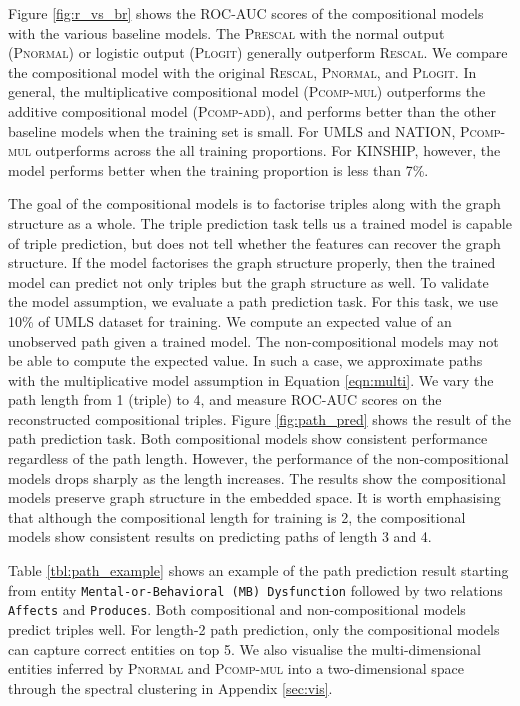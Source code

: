 Figure \ref{fig:r_vs_br} shows the ROC-AUC scores of the compositional models
with the various baseline models. The \textsc{Prescal} with
the normal output (\textsc{Pnormal}) or logistic output (\textsc{Plogit}) generally outperform \textsc{Rescal}.
We compare the compositional model with the original \textsc{Rescal}, \textsc{Pnormal}, and \textsc{Plogit}.
In general, the multiplicative compositional model (\textsc{Pcomp-mul}) outperforms
the additive compositional model (\textsc{Pcomp-add}), and performs better than the other baseline models
when the training set is small. For UMLS and NATION, \textsc{Pcomp-mul} outperforms
across the all training proportions.
For KINSHIP, however, the model performs better when the training proportion is less than 7\%.

The goal of the compositional models is to factorise triples along with the graph structure as a whole.
The triple prediction task tells us a trained model is capable of triple prediction,
but does not tell whether the features can recover the graph structure.
If the model factorises the graph structure properly,
then the trained model can predict not only triples but the graph structure as well.
To validate the model assumption, we evaluate a path prediction task.
For this task, we use 10\% of UMLS dataset for training.
We compute an expected value of an unobserved path given a trained model.
The non-compositional models may not be able to compute the expected value.
In such a case, we approximate paths with the multiplicative model assumption in Equation \ref{eqn:multi}.
We vary the path length from 1 (triple) to 4, and measure ROC-AUC scores on the reconstructed compositional triples.
Figure \ref{fig:path_pred} shows the result of the path prediction task.
Both compositional models show consistent performance regardless of the path length.
However, the performance of the non-compositional models drops sharply as the length increases.
The results show the compositional models preserve graph structure in the embedded space.
It is worth emphasising that although the compositional length for training is 2,
the compositional models show consistent results on predicting paths of length 3 and 4.

Table \ref{tbl:path_example} shows an example of the path prediction result
starting from entity \texttt{Mental-or-Behavioral (MB) Dysfunction} followed by two relations \texttt{Affects} and \texttt{Produces}.
Both compositional and non-compositional models predict triples well.
For length-2 path prediction, only the compositional models can capture correct entities on top 5.
We also visualise the multi-dimensional entities inferred by \textsc{Pnormal} and \textsc{Pcomp-mul}
into a two-dimensional space through the spectral clustering \cite{von2007tutorial}
in Appendix \ref{sec:vis}.


